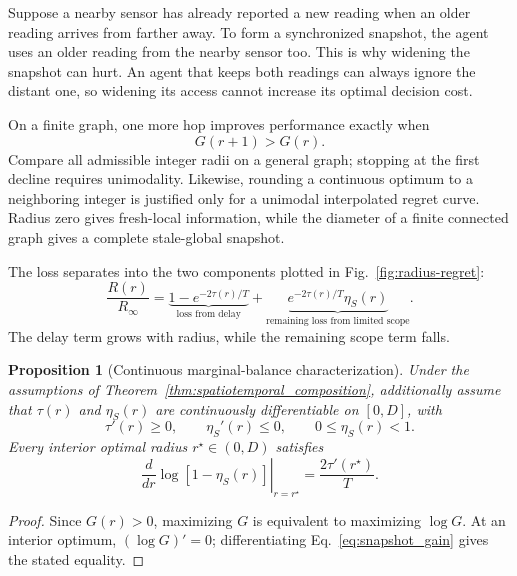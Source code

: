 \documentclass[11pt]{article}
\newtheorem{proposition}{Proposition}
\begin{document}
Suppose a nearby sensor has already reported a new reading when an older
reading arrives from farther away. To form a synchronized snapshot, the agent
uses an older reading from the nearby sensor too. This is why widening the
snapshot can hurt. An agent that keeps both readings can always ignore the
distant one, so widening its access cannot increase its optimal decision cost.

On a finite graph, one more hop improves performance exactly when
\begin{equation}
G(r+1)>G(r).
\label{eq:discrete_radius_improvement}
\end{equation}
Compare all admissible integer radii on a general graph; stopping at the
first decline requires unimodality. Likewise, rounding a continuous optimum
to a neighboring integer is justified only for a unimodal interpolated
regret curve. Radius zero gives fresh-local information, while the diameter
of a finite connected graph gives a complete stale-global snapshot.

The loss separates into the two components plotted in
Fig.~\ref{fig:radius-regret}:
\begin{equation}
\frac{R(r)}{R_\infty}
=\underbrace{1-e^{-2\tau(r)/T}}_{\text{loss from delay}}
+\underbrace{e^{-2\tau(r)/T}\eta_S(r)}_{\text{remaining loss from limited scope}}.
\label{eq:R_decomposition}
\end{equation}
The delay term grows with radius, while the remaining scope term falls.

\begin{proposition}[Continuous marginal-balance characterization]
\label{thm:marginal_balance}
Under the assumptions of
Theorem~\ref{thm:spatiotemporal_composition}, additionally assume that
$\tau(r)$ and $\eta_S(r)$ are continuously differentiable on $[0,D]$, with
\[
    \tau'(r)\ge0,\qquad \eta_S'(r)\le0,\qquad 0\le\eta_S(r)<1.
\]
Every interior optimal radius $r^\star\in(0,D)$ satisfies
\begin{equation}
\left.\frac{d}{dr}\log[1-\eta_S(r)]\right|_{r=r^\star}
=\frac{2\tau'(r^\star)}{T}.
\label{eq:marginal_balance_condition}
\end{equation}
\end{proposition}

\begin{proof}
Since $G(r)>0$, maximizing $G$ is equivalent to maximizing $\log G$.
At an interior optimum, $(\log G)'=0$; differentiating
Eq.~\eqref{eq:snapshot_gain} gives the stated equality.
\end{proof}
\end{document}
